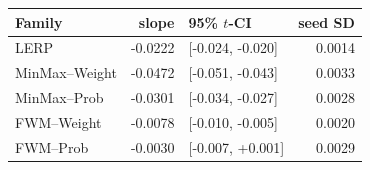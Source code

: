 \begin{tabular}{lrlr}
\toprule
Family & slope & 95\% $t$-CI & seed SD \\
\midrule
LERP & -0.0222 & [-0.024, -0.020] & 0.0014 \\
MinMax--Weight & -0.0472 & [-0.051, -0.043] & 0.0033 \\
MinMax--Prob & -0.0301 & [-0.034, -0.027] & 0.0028 \\
FWM--Weight & -0.0078 & [-0.010, -0.005] & 0.0020 \\
FWM--Prob & -0.0030 & [-0.007, +0.001] & 0.0029 \\
\bottomrule
\end{tabular}

